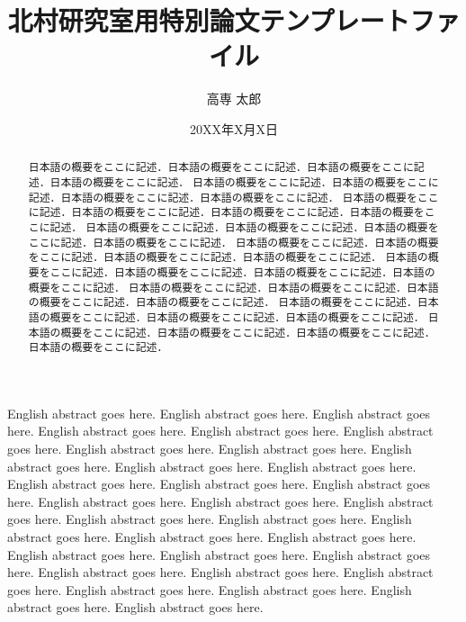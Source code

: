 \documentclass[senkouka,sadoku]{nitkagawathesis}%
\title{北村研究室用特別論文テンプレートファイル}
\author{高専 太郎}
\date{20XX年X月X日} %
\begin{document}

\maketitle%

\frontmatter


\begin{eabstract} %
  English abstract goes here. English abstract goes here. English abstract goes here. English abstract goes here.
  English abstract goes here. English abstract goes here. English abstract goes here. English abstract goes here.
  English abstract goes here. English abstract goes here. English abstract goes here. English abstract goes here.
  English abstract goes here. English abstract goes here. English abstract goes here. English abstract goes here.
  English abstract goes here. English abstract goes here. English abstract goes here. English abstract goes here.
  English abstract goes here. English abstract goes here. English abstract goes here. English abstract goes here.
  English abstract goes here. English abstract goes here. English abstract goes here. English abstract goes here.
  English abstract goes here. English abstract goes here. English abstract goes here. English abstract goes here.
\end{eabstract}

\begin{abstract} %
  日本語の概要をここに記述．日本語の概要をここに記述．日本語の概要をここに記述．日本語の概要をここに記述．
  日本語の概要をここに記述．日本語の概要をここに記述．日本語の概要をここに記述．日本語の概要をここに記述．
  日本語の概要をここに記述．日本語の概要をここに記述．日本語の概要をここに記述．日本語の概要をここに記述．
  日本語の概要をここに記述．日本語の概要をここに記述．日本語の概要をここに記述．日本語の概要をここに記述．
  日本語の概要をここに記述．日本語の概要をここに記述．日本語の概要をここに記述．日本語の概要をここに記述．
  日本語の概要をここに記述．日本語の概要をここに記述．日本語の概要をここに記述．日本語の概要をここに記述．
  日本語の概要をここに記述．日本語の概要をここに記述．日本語の概要をここに記述．日本語の概要をここに記述．
  日本語の概要をここに記述．日本語の概要をここに記述．日本語の概要をここに記述．日本語の概要をここに記述．
  日本語の概要をここに記述．日本語の概要をここに記述．日本語の概要をここに記述．日本語の概要をここに記述．
\end{abstract}
\end{document}
